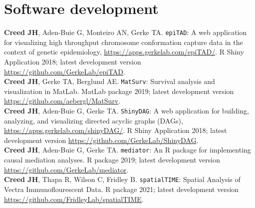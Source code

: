 \documentclass[11pt, a4paper]{article} %
\newcommand{\years}[1]{\marginnote{\scriptsize \raise .3ex\hbox{#1}}} %
\begin{document}


\section*{Software development}

{\bf Creed JH}, Aden-Buie G, Monteiro AN, Gerke TA. \verb|epiTAD|: A web application for visualizing high throughput chromosome conformation capture data in the context of genetic epidemiology, \href{https://apps.gerkelab.com/epiTAD/}{https://apps.gerkelab.com/epiTAD/}. R Shiny Application 2018; latest development version \href{https://github.com/GerkeLab/epiTAD}{https://github.com/GerkeLab/epiTAD}.\\

{\bf Creed JH}, Gerke TA, Berglund AE. \verb|MatSurv|: Survival analysis and visualization in MatLab. MatLab package 2019; latest development version \href{https://github.com/aebergl/MatSurv}{https://github.com/aebergl/MatSurv}. \\ 

{\bf Creed JH}, Aden-Buie G, Gerke TA. \verb|ShinyDAG|: A web application for building, analyzing, and visualizing directed acyclic graphs (DAGs), \href{https://apps.gerkelab.com/shinyDAG/}{https://apps.gerkelab.com/shinyDAG/}. R Shiny Application 2018; latest development version \href{https://github.com/GerkeLab/ShinyDAG}{https://github.com/GerkeLab/ShinyDAG}. \\

{\bf Creed JH}, Aden-Buie G, Gerke TA. \verb|mediator|: An R package for implementing causal mediation analyses. R package 2019; latest development version \href{https://github.com/GerkeLab/mediator}{https://github.com/GerkeLab/mediator}. \\

{\bf Creed JH}, Thapa R, Wilson C, Fridley B. \verb|spatialTIME|: Spatial Analysis of Vectra Immunoflourescent Data. R package 2021; latest development version
\\\href{https://github.com/FridleyLab/spatialTIME}{https://github.com/FridleyLab/spatialTIME}. \\
\end{document}
